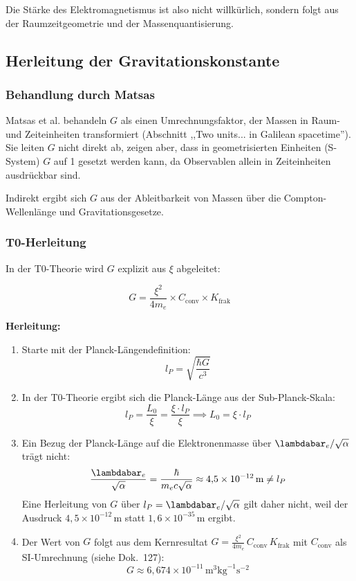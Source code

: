 	Die Stärke des Elektromagnetismus ist also nicht willkürlich, sondern folgt aus der Raumzeitgeometrie und der Massenquantisierung.
	
	\subsection{Herleitung der Gravitationskonstante}\label{sec:G_derivation}
	
	\subsubsection{Behandlung durch Matsas}
	
	Matsas et al. behandeln $G$ als einen Umrechnungsfaktor, der Massen in Raum- und Zeiteinheiten transformiert (Abschnitt ,,Two units... in Galilean spacetime''). Sie leiten $G$ nicht direkt ab, zeigen aber, dass in geometrisierten Einheiten (S-System) $G$ auf 1 gesetzt werden kann, da Observablen allein in Zeiteinheiten ausdrückbar sind.
	
	Indirekt ergibt sich $G$ aus der Ableitbarkeit von Massen über die Compton-Wellenlänge und Gravitationsgesetze.
	
	\subsubsection{T0-Herleitung}
	
	In der T0-Theorie wird $G$ explizit aus $\xi$ abgeleitet:
	
	\begin{keyresult}
		\[
		G = \frac{\xi^2}{4 m_e} \times C_{\text{conv}} \times K_{\text{frak}}
		\]
	\end{keyresult}
	
	\textbf{Herleitung:}
	
	\begin{enumerate}
		\item Starte mit der Planck-Längendefinition:
		\[
		l_P = \sqrt{\frac{\hbar G}{c^3}}
		\]
		
		\item In der T0-Theorie ergibt sich die Planck-Länge aus der Sub-Planck-Skala:
		\[
		l_P = \frac{L_0}{\xi} = \frac{\xi \cdot l_P}{\xi} \implies L_0 = \xi \cdot l_P
		\]
		
		\item Ein Bezug der Planck-Länge auf die Elektronenmasse über $\lambdabar_e/\sqrt{\alpha}$ trägt nicht:
		\[
		\frac{\lambdabar_e}{\sqrt{\alpha}} = \frac{\hbar}{m_e c \sqrt{\alpha}} \approx 4{,}5\times10^{-12}\,\text{m} \neq l_P
		\]
		Eine Herleitung von $G$ über $l_P = \lambdabar_e/\sqrt{\alpha}$ gilt daher nicht, weil der Ausdruck $4{,}5\times10^{-12}$\,m statt $1{,}6\times10^{-35}$\,m ergibt.
		
		\item Der Wert von $G$ folgt aus dem Kernresultat $G=\frac{\xi^2}{4m_e}\,C_{\text{conv}}\,K_{\text{frak}}$ mit $C_{\text{conv}}$ als SI-Umrechnung (siehe Dok.~127):
		\[
		G \approx 6{,}674 \times 10^{-11}\,\text{m}^3\text{kg}^{-1}\text{s}^{-2}
		\]
	\end{enumerate}
	
